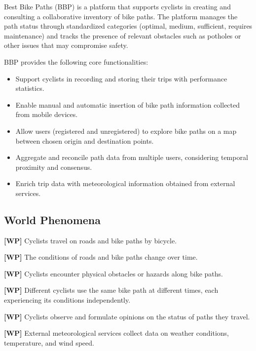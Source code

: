 Best Bike Paths (BBP) is a platform that supports cyclists in creating and consulting a collaborative inventory of bike paths. The platform manages the path status through standardized categories (optimal, medium, sufficient, requires maintenance) and tracks the presence of relevant obstacles such as potholes or other issues that may compromise safety. %

BBP provides the following core functionalities:
\begin{itemize}
    \item Support cyclists in recording and storing their trips with performance statistics.
    \item Enable manual and automatic insertion of bike path information collected from mobile devices.
    \item Allow users (registered and unregistered) to explore bike paths on a map between chosen origin and destination points.
    \item Aggregate and reconcile path data from multiple users, considering temporal proximity and consensus.
    \item Enrich trip data with meteorological information obtained from external services.
\end{itemize}


\subsection{World Phenomena}
\label{subsec:world_phenomena}
\setcounter{wp}{1}
\newcommand{\cwp}{\thewp{}}

        \textbf{[WP\cwp]} Cyclists travel on roads and bike paths by bicycle.

        \textbf{[WP\cwp]} The conditions of roads and bike paths change over time.

        \textbf{[WP\cwp]} Cyclists encounter physical obstacles or hazards along bike paths.

        \textbf{[WP\cwp]}  Different cyclists use the same bike path at different times, each experiencing its conditions independently.

        \textbf{[WP\cwp]} Cyclists observe and formulate opinions on the status of paths they travel. %
        
        \textbf{[WP\cwp]} External meteorological services collect data on weather conditions, temperature, and wind speed. 


